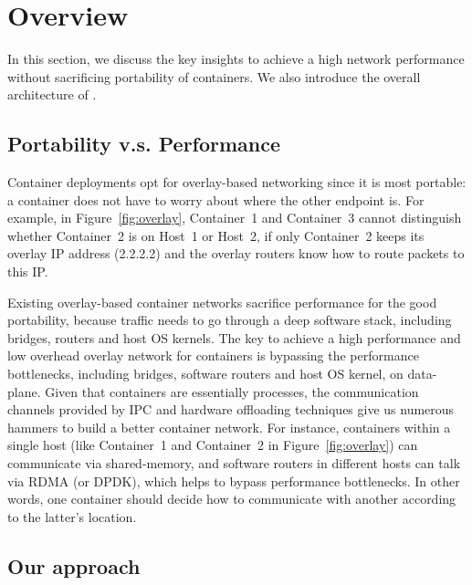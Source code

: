 \section{Overview} \label{sec:overview}

In this section, we discuss the key insights to achieve a high network
performance without sacrificing portability of containers. We also 
introduce the overall architecture of \sysname. 


\subsection{Portability v.s. Performance}
Container deployments opt for overlay-based networking since it is most
portable: a container does not have to worry about where the other endpoint is.
For example, in Figure~\ref{fig:overlay}, Container~1 and Container~3 cannot
distinguish whether Container~2 is on Host~1 or Host~2, if only Container~2
keeps its overlay IP address (2.2.2.2) and the overlay routers know how to
route packets to this IP. 

Existing overlay-based container networks sacrifice performance for 
the good portability, because traffic needs to go through a deep software 
stack, including bridges, routers and host OS kernels. 
The key to achieve a high performance and low overhead overlay network for
containers is bypassing the performance bottlenecks, including bridges, software
routers and host OS kernel, on data-plane. Given that containers are essentially
processes, the communication channels provided by IPC and hardware offloading
techniques give us numerous hammers to build a better container network. For
instance, containers within a single host (like Container~1 and Container~2 in
Figure~\ref{fig:overlay}) can communicate via shared-memory, and software routers
in different hosts can talk via RDMA (or DPDK), which helps to bypass performance
bottlenecks. In other words, one container should decide how to communicate
with another according to the latter's location. 

\subsection{Our approach}

